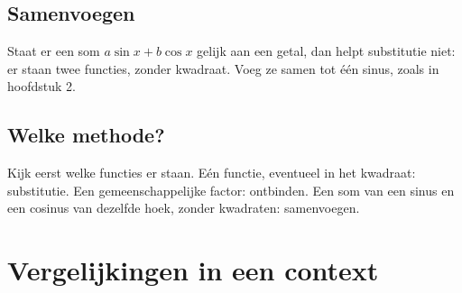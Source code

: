\begin{oefeningen}
\end{oefeningen}

\subsection{Samenvoegen}

Staat er een som $a\sin x + b\cos x$ gelijk aan een getal, dan helpt substitutie niet: er staan twee functies, zonder kwadraat. Voeg ze samen tot één sinus, zoals in hoofdstuk 2.


\begin{oefeningen}
\end{oefeningen}

\subsection{Welke methode?}

Kijk eerst welke functies er staan. Eén functie, eventueel in het kwadraat: substitutie. Een gemeenschappelijke factor: ontbinden. Een som van een sinus en een cosinus van dezelfde hoek, zonder kwadraten: samenvoegen.

\begin{oefeningen}
\end{oefeningen}

\section{Vergelijkingen in een context}

